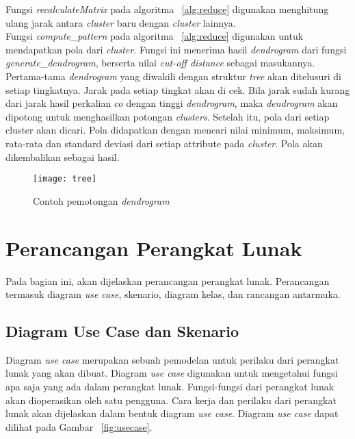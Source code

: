 Fungsi \textit{recalculateMatrix} pada algoritma ~\ref{alg:reduce} digunakan menghitung ulang jarak antara \textit{cluster} baru dengan \textit{cluster} lainnya. \\

Fungsi \textit{compute}\_\textit{pattern} pada algoritma ~\ref{alg:reduce} digunakan untuk mendapatkan pola dari \textit{cluster}. Fungsi ini menerima hasil \textit{dendrogram} dari fungsi \textit{generate}\_\textit{dendrogram}, berserta nilai \textit{cut-off distance} sebagai masukannya. Pertama-tama \textit{dendrogram} yang diwakili dengan struktur \textit{tree} akan ditelusuri di setiap tingkatnya. Jarak pada setiap tingkat akan di cek. Bila jarak sudah kurang dari jarak hasil perkalian $co$ dengan tinggi \textit{dendrogram}, maka \textit{dendrogram} akan dipotong untuk menghasilkan potongan \textit{clusters}. Setelah itu, pola dari setiap cluster akan dicari. Pola didapatkan dengan mencari nilai minimum, maksimum, rata-rata dan standard deviasi dari setiap attribute pada \textit{cluster}. Pola akan dikembalikan sebagai hasil.

\begin{figure}[H]
    \centering  
    \texttt{[image: tree]}  
    \caption[Contoh pemotongan \textit{dendrogram}]{Contoh pemotongan \textit{dendrogram}} 
    \label{fig:tree} 
\end{figure}


 

\section{Perancangan Perangkat Lunak}

Pada bagian ini, akan dijelaskan perancangan perangkat lunak.  Perancangan termasuk diagram \textit{use case}, skenario, diagram kelas, dan rancangan antarmuka. 


\subsection{Diagram Use Case dan Skenario}

Diagram \textit{use case} merupakan sebuah pemodelan untuk perilaku dari perangkat lunak yang akan dibuat. Diagram \textit{use case} digunakan untuk mengetahui fungsi apa saja yang ada dalam perangkat lunak. Fungsi-fungsi dari perangkat lunak akan dioperasikan oleh satu pengguna. Cara kerja dan perilaku dari perangkat lunak akan dijelaskan dalam bentuk diagram \textit{use case}. Diagram \textit{use case} dapat dilihat pada Gambar ~\ref{fig:usecase}.

